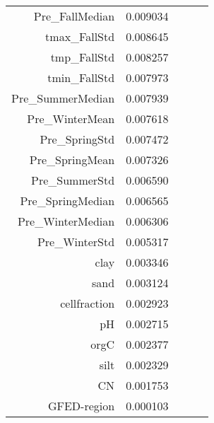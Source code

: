 \begin{tabular}{rrrrr}
Pre_FallMedian & 0.009034 \\
tmax_FallStd & 0.008645 \\
tmp_FallStd & 0.008257 \\
tmin_FallStd & 0.007973 \\
Pre_SummerMedian & 0.007939 \\
Pre_WinterMean & 0.007618 \\
Pre_SpringStd & 0.007472 \\
Pre_SpringMean & 0.007326 \\
Pre_SummerStd & 0.006590 \\
Pre_SpringMedian & 0.006565 \\
Pre_WinterMedian & 0.006306 \\
Pre_WinterStd & 0.005317 \\
clay & 0.003346 \\
sand & 0.003124 \\
cellfraction & 0.002923 \\
pH & 0.002715 \\
orgC & 0.002377 \\
silt & 0.002329 \\
CN & 0.001753 \\
GFED-region & 0.000103 \\
\bottomrule
\end{tabular}
